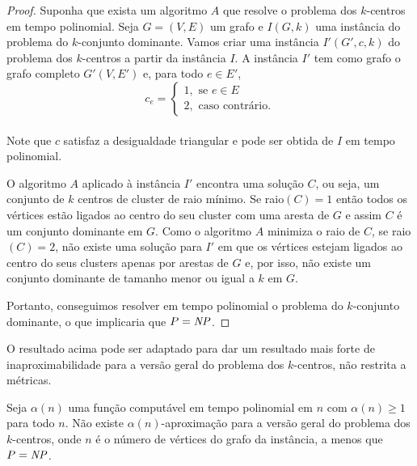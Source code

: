 \begin{proof}
    Suponha que exista um algoritmo $A$ que resolve o problema dos $k$-centros em tempo polinomial. Seja $G = (V,E)$ um grafo e $I(G,k)$ uma instância do problema do $k$-conjunto dominante. Vamos criar uma instância $I'(G',c,k)$ do problema dos $k$-centros a partir da instância $I$. A instância $I'$ tem como grafo o grafo completo $G'(V,E')$ e, para todo $e \in E'$,
    \[
    c_e = \begin{cases}
            1, \text{ se } e \in E \\
            2, \text{ caso contrário.} 
            \end{cases}\]\\
    Note que $c$ satisfaz a desigualdade triangular e pode ser obtida de $I$ em tempo polinomial.

    O algoritmo $A$ aplicado à instância $I'$ encontra uma solução $C$, ou seja, um conjunto de $k$ centros de cluster de raio mínimo. Se raio$(C)=1$ então todos os vértices estão ligados ao centro do seu cluster com uma aresta de $G$ e assim $C$ é um conjunto dominante em $G$. 
    Como o algoritmo $A$ minimiza o raio de $C$, se raio$(C)=2$, não existe uma solução para $I'$ em que os vértices estejam ligados ao centro do seus clusters apenas por arestas de $G$ e, por isso, não existe um conjunto dominante de tamanho menor ou igual a $k$ em $G$.

    Portanto, conseguimos resolver em tempo polinomial o problema do $k$-conjunto dominante, o que implicaria que $P = \mathit{NP}$.
\end{proof}

O resultado acima pode ser adaptado para dar um resultado mais forte de inaproximabilidade para a versão geral do problema dos $k$-centros, não restrita a métricas.
\begin{theorem}
    Seja $\alpha(n)$ uma função computável em tempo polinomial em $n$ com $\alpha(n)\geq 1$ para todo $n$. Não existe $\alpha(n)$-aproximação para a versão geral do problema dos $k$-centros, onde $n$ é o número de vértices do grafo da instância, a menos que $P=\mathit{NP}$.
\end{theorem}

